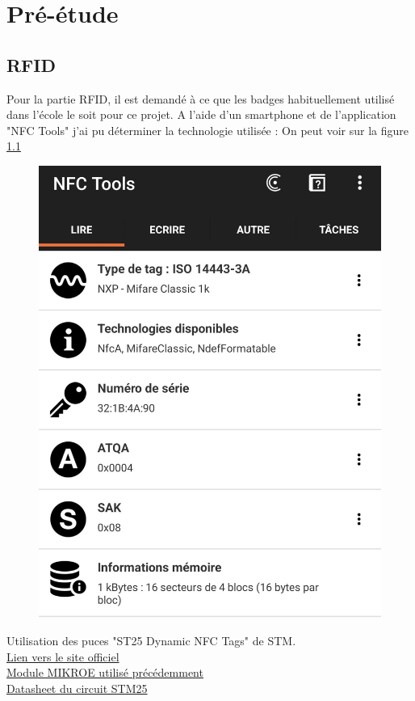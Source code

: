 \cleardoublepage
\chapter{Pré-étude}

\section{RFID}

Pour la partie RFID, il est demandé à ce que les badges habituellement utilisé dans
l'école le soit pour ce projet. A l'aide d'un smartphone et de l'application "NFC Tools"
j'ai pu déterminer la technologie utilisée :
On peut voir sur la figure \ref{fig:screenshotnfctools}

\begin{figure}[h]
	\centering
	\includegraphics[width=0.7\linewidth]{2312_Images/2312_Pre-etude/Screenshot_NFC_Tools}
	\caption{}
	\label{fig:screenshotnfctools}
\end{figure}

Utilisation des puces "ST25 Dynamic NFC Tags" de STM. \\
\href{https://www.st.com/en/nfc/st25-dynamic-nfc-tags.html}{Lien vers le site officiel} \\
\href{https://www.mikroe.com/rfid-click}{Module MIKROE utilisé précédemment} \\
\href{https://www.st.com/content/ccc/resource/technical/document/datasheet/e2/ed/a5/4c/6b/42/46/91/DM00097458.pdf/files/DM00097458.pdf/jcr:content/translations/en.DM00097458.pdf}{Datasheet du circuit STM25}

